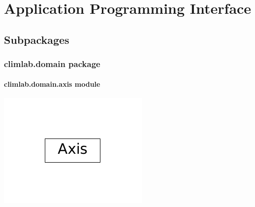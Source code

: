 \documentclass[a4paper,10pt,english]{sphinxmanual}
\begin{document}
\chapter{Application Programming Interface}
\label{api/climlab:application-programming-interface}\label{api/climlab::doc}\label{api/climlab:module-climlab}

\section{Subpackages}
\label{api/climlab:subpackages}

\subsection{climlab.domain package}
\label{api/climlab.domain:climlab-domain-package}\label{api/climlab.domain::doc}

\subsubsection{climlab.domain.axis module}
\label{api/climlab.domain:climlab-domain-axis-module}
\includegraphics{inheritance-ecdec26b4dd4dc2ffb13ee9d91595cd439ae67e7.pdf}
\label{api/climlab.domain:module-climlab.domain.axis}
\end{document}
